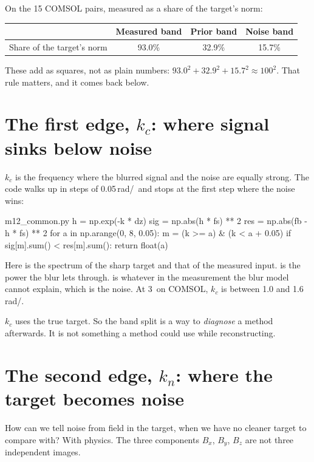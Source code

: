 On the 15 COMSOL pairs, measured as a share of the target's norm:
\begin{center}
\begin{tabular}{lccc}
\toprule
 & Measured band & Prior band & Noise band \\
\midrule
Share of the target's norm & 93.0\% & 32.9\% & 15.7\% \\
\bottomrule
\end{tabular}
\end{center}
These add as squares, not as plain numbers: $93.0^2+32.9^2+15.7^2\approx100^2$. That rule matters, and it comes back
below.

\section{The first edge, $k_c$: where signal sinks below noise}

$k_c$ is the frequency where the blurred signal and the noise are equally strong. The code walks up in steps of
0.05\,rad/\um\ and stops at the first step where the noise wins:

\begin{code*}{m12_common.py}
    h = np.exp(-k * dz)
    sig = np.abs(h * fs) ** 2
    res = np.abs(fb - h * fs) ** 2
    for a in np.arange(0, 8, 0.05):
        m = (k >= a) & (k < a + 0.05)
        if sig[m].sum() < res[m].sum():
            return float(a)
\end{code*}

Here  is the spectrum of the sharp target and  that of the measured input.  is the power the
blur lets through.  is whatever in the measurement the blur model cannot explain, which is the noise. At
3\um\ on COMSOL, $k_c$ is between 1.0 and 1.6\,rad/\um.

\begin{careful}
$k_c$ uses the true target. So the band split is a way to \emph{diagnose} a method afterwards. It is not something a
method could use while reconstructing.
\end{careful}

\section{The second edge, $k_n$: where the target becomes noise}

How can we tell noise from field in the target, when we have no cleaner target to compare with? With physics. The
three components $B_x$, $B_y$, $B_z$ are not three independent images.

